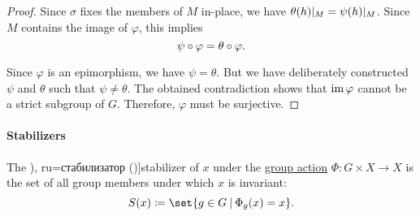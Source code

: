 \begin{proof}
  Since \( \sigma \) fixes the members of \( M \) in-place, we have \( \theta(h)\vert_M = \psi(h)\vert_M \). Since \( M \) contains the image of \( \varphi \), this implies
  \begin{equation*}
    \psi \bincirc \varphi = \theta \bincirc \varphi.
  \end{equation*}

  Since \( \varphi \) is an epimorphism, we have \( \psi = \theta \). But we have deliberately constructed \( \psi \) and \( \theta \) such that \( \psi \neq \theta \). The obtained contradiction shows that \( \operatorname{im} \varphi \) cannot be a strict subgroup of \( G \). Therefore, \( \varphi \) must be surjective.
\end{proof}

\paragraph{Stabilizers}

\begin{definition}\label{def:group_action_stabilizer}
  The \term[bg=стабилизатор (\cite[def. IV.19]{ГеновМиховскиМоллов1991Алгебра}), ru=стабилизатор (\cite[179]{Винберг2014КурсАлгебры})]{stabilizer} of \( x \) under the \hyperref[def:group_action]{group action} \( \Phi: G \times X \to X \) is the set of all group members under which \( x \) is invariant:
  \begin{equation*}
    S(x) \coloneqq \set{ g \in G \given \Phi_g(x) = x }.
  \end{equation*}
\end{definition}

